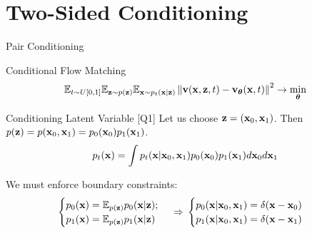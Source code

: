\documentclass{beamer}
\renewcommand{\eqpause}{}
\renewcommand{\nextonslide}[1]{#1}
\begin{document}
\section{Two-Sided Conditioning}
\begin{frame}{Pair Conditioning}
	\begin{block}{Conditional Flow Matching}
		\vspace{-0.3cm}
		\[
			\mathbb{E}_{t \sim U[0, 1]} \mathbb{E}_{\mathbf{z} \sim p(\mathbf{z})} \mathbb{E}_{\mathbf{x} \sim p_t(\mathbf{x} | \mathbf{z})}\left\| \mathbf{v}(\mathbf{x}, \mathbf{z}, t) - \mathbf{v}_{\boldsymbol{\theta}}(\mathbf{x}, t) \right\|^2 \rightarrow \min_{\boldsymbol{\theta}}
		\]
		\vspace{-0.3cm}
	\end{block}
	\begin{block}{Conditioning Latent Variable [Q1]}
		Let us choose $\mathbf{z} = (\mathbf{x}_0, \mathbf{x}_1)$. Then $p(\mathbf{z}) = p (\mathbf{x}_0, \mathbf{x}_1) = p_0(\mathbf{x}_0) p_1(\mathbf{x}_1)$.
		\[
			p_t(\mathbf{x}) = \int p_t(\mathbf{x} | \mathbf{x}_0, \mathbf{x}_1) p_0(\mathbf{x}_0) p_1(\mathbf{x}_1) d \mathbf{x}_0 d \mathbf{x}_1
		\]
	\end{block}
	\eqpause
	We must enforce boundary constraints:
	\[
		\begin{cases}
			p_0(\bx) = \bbE_{p(\bz)} p_0(\bx | \bz); \\
			p_1(\bx) = \bbE_{p(\bz)} p_1(\bx | \bz)
		\end{cases}
		\, 
		\nextonslide{
			\Rightarrow \, 
			\begin{cases}
				p_0(\bx | \bx_0, \bx_1) = \delta(\bx - \bx_0) \\
				p_1(\bx | \bx_0, \bx_1) = \delta(\bx - \bx_1)
			\end{cases}
		}
	\]
	\vspace{-0.3cm}
\end{frame}
\end{document}
